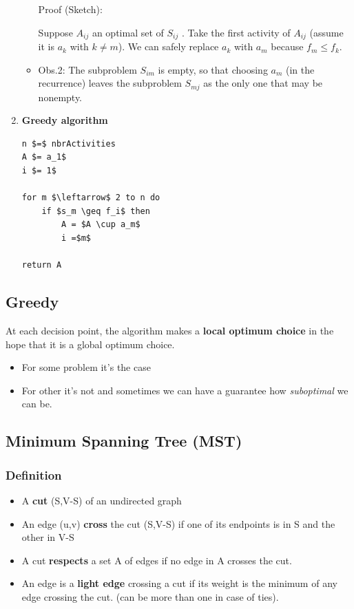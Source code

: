\begin{enumerate}
\begin{itemize}
                Proof (Sketch):
                \begin{small}
                    Suppose $A_{ij}$ an optimal set of $S_{ij}$ . Take
                    the first activity of $A_{ij}$ (assume it is $a_k$ with $k \neq m$). We
                    can safely replace $a_k$ with $a_m$ because $f_m \leq f_k$.
                \end{small}

            \item Obs.2: The subproblem $S_{im}$ is empty, so that choosing
                $a_m$ (in the recurrence) leaves the subproblem $S_{mj}$ as the
                only one that may be nonempty.
        \end{itemize}


    \item \textbf{Greedy algorithm}
        \begin{lstlisting}[mathescape]
n $=$ nbrActivities
A $= a_1$
i $= 1$

for m $\leftarrow$ 2 to n do
    if $s_m \geq f_i$ then
        A = $A \cup a_m$
        i =$m$

return A
        \end{lstlisting}
\end{enumerate}


\subsection{Greedy}
At each decision point, the algorithm makes
a \textbf{local optimum choice} in the hope that it is a global
optimum choice.
\begin{itemize}
    \item For some problem it's the case
    \item For other it's not and sometimes we can 
        have a guarantee how
        \textit{suboptimal} we can be.
\end{itemize}


\subsection{Minimum Spanning Tree (MST)}

\subsubsection{Definition}
\begin{itemize}
    \item A \textbf{cut} (S,V-S) of an undirected graph
    \item An edge (u,v) \textbf{cross} the cut (S,V-S) if one of its
        endpoints is in S and the other in V-S
    \item A cut \textbf{respects} a set A of edges if no edge in A crosses
        the cut.
    \item An edge is a \textbf{light edge} crossing a cut if its weight is
        the minimum of any edge crossing the cut. (can be
        more than one in case of ties).
\end{itemize}

